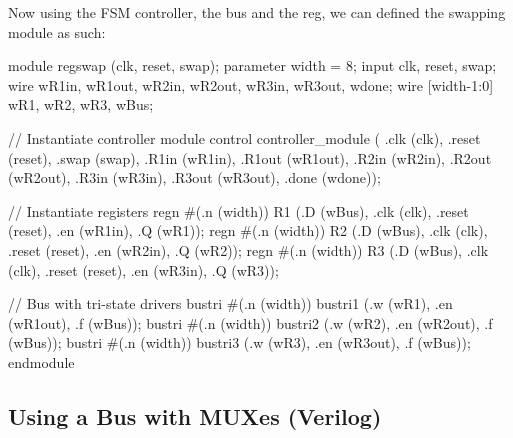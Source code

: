 \documentclass[12pt,openany]{book}
\begin{document}
\begin{minipage}[htp]{1\textwidth}
	Now using the FSM controller, the bus and the reg, we can defined the swapping module as such:
	\begin{vhdl}
	module regswap (clk, reset, swap);
		parameter width = 8;
		input clk, reset, swap;
		wire wR1in, wR1out, wR2in, wR2out, wR3in, wR3out, wdone;
		wire [width-1:0] wR1, wR2, wR3, wBus;
	
		// Instantiate controller module
		control controller_module ( .clk (clk), .reset (reset), .swap (swap),
		.R1in (wR1in), .R1out (wR1out), .R2in (wR2in), .R2out (wR2out),
		.R3in (wR3in), .R3out (wR3out), .done (wdone));
	
		// Instantiate registers
		regn #(.n (width)) R1 (.D (wBus), .clk (clk), .reset (reset), .en (wR1in), .Q (wR1));
		regn #(.n (width)) R2 (.D (wBus), .clk (clk), .reset (reset), .en (wR2in), .Q (wR2));
		regn #(.n (width)) R3 (.D (wBus), .clk (clk), .reset (reset), .en (wR3in), .Q (wR3));
	
		// Bus with tri-state drivers
		bustri #(.n (width)) bustri1 (.w (wR1), .en (wR1out), .f (wBus));
		bustri #(.n (width)) bustri2 (.w (wR2), .en (wR2out), .f (wBus));
		bustri #(.n (width)) bustri3 (.w (wR3), .en (wR3out), .f (wBus));
	endmodule
	\end{vhdl}
\end{minipage}

\subsection{Using a Bus with MUXes (Verilog)}
\end{document}
